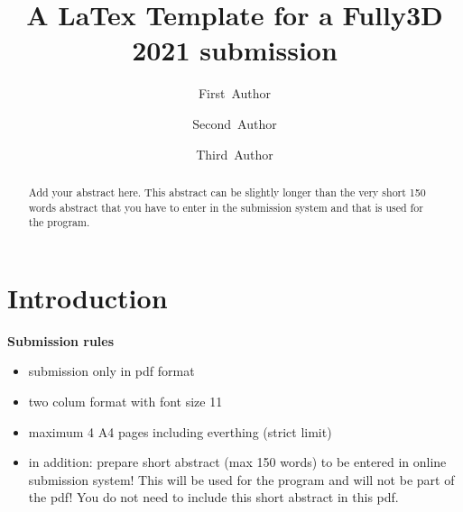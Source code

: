 \documentclass[11pt,twocolumn,twoside]{article}
\begin{document}

\title{\sffamily\bfseries A LaTex Template for a Fully3D 2021 submission} 

\author[1]{\small First~Author}
\author[1]{\small Second~Author}
\author[2]{\small Third~Author}



\date{}

\maketitle
\thispagestyle{fancy}

\begin{abstract}
\footnotesize\bfseries

Add your abstract here. This abstract can be slightly longer than the very short 
150 words abstract that you have to enter in the submission system and that is used 
for the program. 
\end{abstract}



\section{Introduction}

\textbf{\color{red}Submission rules}
\begin{itemize}[itemsep=0pt,parsep=0pt,topsep=0pt, partopsep=0pt]
\item submission only in pdf format
\item two colum format with font size 11
\item maximum 4 A4 pages including everthing (strict limit)
\item in addition: prepare short abstract (max 150 words) 
      to be entered in online submission system!
      This will be used for the program and will not be part of the pdf!
      You do not need to include this short abstract in this pdf.
\end{itemize}
\end{document}
